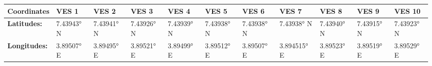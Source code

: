 \documentclass[12pt,a4paper]{report}
\begin{document}
\begin{table}[h!]
    \centering
    \begin{adjustbox}{max width=\textwidth}
    \renewcommand{\arraystretch}{1.5}
    \begin{tabular}{|p{2.5cm}|p{1.5cm}|p{1.8cm}|p{1.5cm}|p{1.8cm}|p{1.5cm}|p{1.8cm}|p{1.5cm}|p{1.8cm}|p{1.5cm}|p{1.8cm}|}
    \hline
    \textbf{Coordinates} &  
    \textbf{VES 1} & 
    \textbf{VES 2} & 
    \textbf{VES 3} & 
    \textbf{VES 4} & 
    \textbf{VES 5} & 
    \textbf{VES 6} & 
    \textbf{VES 7} & 
    \textbf{VES 8} & 
    \textbf{VES 9} & 
    \textbf{VES 10} \\ 
    \hline
    \textbf{Latitudes:} & 7.43943° N & 7.43941° N & 7.43926° N & 7.43939° N & 7.43938° N & 7.43938° N & 7.43938° N & 7.43940° N & 7.43915° N & 7.43923° N \\ \hline
    \textbf{Longitudes:} & 3.89507° E & 3.89495° E & 3.89521° E & 3.89499° E & 3.89512° E & 3.89507° E & 3.894515° E & 3.89523° E & 3.89519° E & 3.89529° E \\ \hline
    \end{tabular}
    \end{adjustbox}
    \label{tab:AAH VES Coordinates: 1-10}
\end{table}
\end{document}
